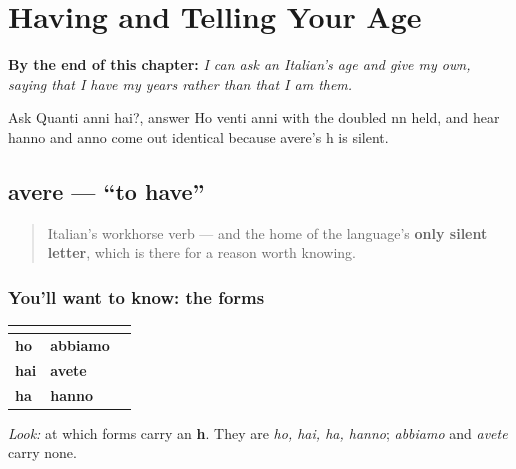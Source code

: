 
\chapter{Having and Telling Your Age}
\label{ch:it-having-and-age}

\begin{chapteropening}
\textbf{By the end of this chapter:} \emph{I can ask an Italian's age and give my own, saying that I have my years rather than that I am them.}

Ask Quanti anni hai?, answer Ho venti anni with the doubled nn held, and hear hanno and anno come out identical because avere's h is silent.
\end{chapteropening}

\section[avere]{avere — \textquotedblleft{}to have\textquotedblright{}}

\label{lesson:IT-C14-avere}



\begin{quote}
Italian's workhorse verb — and the home of the language's \textbf{only silent letter}, which is there for a reason worth knowing.
\end{quote}

\subsection*{You'll want to know: the forms}
\noindent
\begin{tabularx}{\linewidth}{@{}>{\raggedright\arraybackslash}X>{\raggedright\arraybackslash}X>{\raggedright\arraybackslash}X@{}}
\toprule
\textbf{} & \textbf{} & \textbf{} \\
\midrule
\textbf{ho} & \textbf{abbiamo} &  \\
\textbf{hai} & \textbf{avete} &  \\
\textbf{ha} & \textbf{hanno} &  \\
\bottomrule
\end{tabularx}

\emph{Look:} at which forms carry an \textbf{h}. They are \emph{ho, hai, ha, hanno}; \emph{abbiamo} and \emph{avete} carry none.

